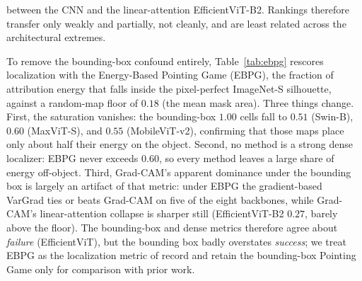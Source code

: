 \documentclass[final,5p,times,twocolumn]{elsarticle}
\begin{document}
between the CNN and the linear-attention EfficientViT-B2. Rankings therefore transfer only weakly and partially, not cleanly, and are least related across the architectural extremes.

To remove the bounding-box confound entirely, Table~\ref{tab:ebpg} rescores localization with the Energy-Based Pointing Game (EBPG), the fraction of attribution energy that falls inside the pixel-perfect ImageNet-S silhouette, against a random-map floor of $0.18$ (the mean mask area). Three things change. First, the saturation vanishes: the bounding-box $1.00$ cells fall to $0.51$ (Swin-B), $0.60$ (MaxViT-S), and $0.55$ (MobileViT-v2), confirming that those maps place only about half their energy on the object. Second, no method is a strong dense localizer: EBPG never exceeds $0.60$, so every method leaves a large share of energy off-object. Third, Grad-CAM's apparent dominance under the bounding box is largely an artifact of that metric: under EBPG the gradient-based VarGrad ties or beats Grad-CAM on five of the eight backbones, while Grad-CAM's linear-attention collapse is sharper still (EfficientViT-B2 $0.27$, barely above the floor). The bounding-box and dense metrics therefore agree about \emph{failure} (EfficientViT), but the bounding box badly overstates \emph{success}; we treat EBPG as the localization metric of record and retain the bounding-box Pointing Game only for comparison with prior work.
\end{document}
